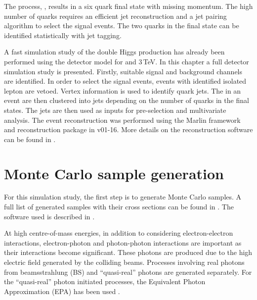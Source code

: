 The process, \eeToHHbbWWHadFull, results in a six quark final state with missing momentum. The high number of quarks requires an efficient jet reconstruction and a jet pairing algorithm to select the signal events. The two \Pbottom quarks in the final state can be identified statistically with \Pbottom jet tagging. %

A fast simulation study of the double Higgs production has already been performed using the \CLICILD detector model for  and 3\,TeV\cite{Linssen:2012hp}. In this chapter a full \CLICILD detector simulation study is presented. Firstly, suitable signal and background channels are identified. In order to select the signal events, events with identified isolated lepton are vetoed.  Vertex information is used to identify \Pbottom quark jets. The \PFOs in an event are then clustered into jets depending on the number of quarks in the final states. The jets are then used as inputs for pre-selection and multivariate analysis. The event reconstruction was performed using the Marlin framework and reconstruction package in \ilcsoft v01-16. More details on the reconstruction software can be found in .







\section{Monte Carlo sample generation}


For this simulation study, the first step is to generate Monte Carlo samples. A full list of generated samples with their cross sections can be found in . The software used  is described in .

At high centre-of-mass energies, in addition to considering electron-electron interactions, electron-photon and photon-photon interactions are important as their interactions become significant. These photons are produced due to the high electric field generated by the colliding beams. Processes involving real photons from beamsstrahlung (BS) and ``quasi-real'' photons are generated separately. For the ``quasi-real'' photon initiated processes, the Equivalent Photon Approximation (EPA) has been used \cite{lyth:jpa00215525}.

